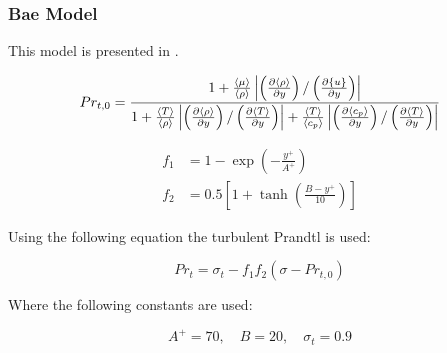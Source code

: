 
\subsubsection{Bae Model}
This model is presented in \cite{bae2016new}.

\begin{equation}
Pr_{t,0} = \frac{1+\frac{\left<{\mu}\right>}{\left<{\rho}\right>}\left|\left(\frac{\partial \left<{\rho}\right>}{\partial {y}}\right)/\left(\frac{\partial \{{u}\}}{\partial {y}}\right)\right|}{1+\frac{\left<{T}\right>}{\left<{\rho}\right>}\left|\left(\frac{\partial \left<{\rho}\right>}{\partial {y}}\right)/\left(\frac{\partial \left<{T}\right>}{\partial {y}}\right)\right|+\frac{\left<{T}\right>}{\left<{c_p}\right>}\left|\left(\frac{\partial \left<{c_p}\right>}{\partial {y}}\right)/\left(\frac{\partial \left<{T}\right>}{\partial {y}}\right)\right|}
\end{equation}


\begin{equation}
\begin{split}
	f_1 &= 1-\exp\left(-\frac{y^+}{A^+}\right) \\
    f_2 &= 0.5\left[1+\tanh\left(\frac{B-y^+}{10}\right)\right]
\end{split}    
\end{equation}

Using the following equation the turbulent Prandtl is used:

\begin{equation} 
Pr_t = \sigma_t - f_1f_2(\sigma-Pr_{t,0})
\end{equation}

Where the following constants are used:

\begin{equation}
A^+ =70, \quad B=20, \quad \sigma_t=0.9
\end{equation}

